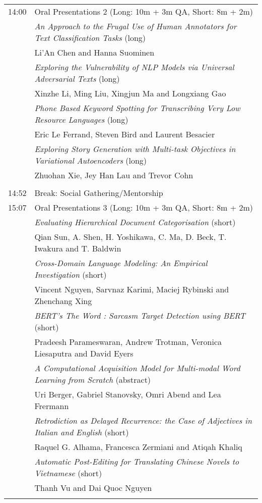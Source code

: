 \begin{longtable}{rl}
14:00 &   Oral Presentations 2 (Long: 10m + 3m QA, Short: 8m + 2m) \\
&  \emph{An Approach to the Frugal Use of Human Annotators for Text Classification Tasks} (long) \\
&  \hspace{.25cm} Li'An Chen and Hanna Suominen \\
&  \emph{Exploring the Vulnerability of NLP Models via Universal Adversarial Texts} (long)\\
&  \hspace{.25cm} Xinzhe Li, Ming Liu, Xingjun Ma and Longxiang Gao\\
&  \emph{Phone Based Keyword Spotting for Transcribing Very Low Resource Languages} (long)\\
&  \hspace{.25cm} Eric Le Ferrand, Steven Bird and Laurent Besacier \\
&  \emph{Exploring Story Generation with Multi-task Objectives in Variational Autoencoders} (long) \\
&  \hspace{.25cm} Zhuohan Xie, Jey Han Lau and Trevor Cohn \\ \\

14:52 & Break: Social Gathering/Mentorship\\

15:07 &   Oral Presentations 3 (Long: 10m + 3m QA, Short: 8m + 2m) \\
&  \emph{Evaluating Hierarchical Document Categorisation} (short) \\
&  \hspace{.25cm} Qian Sun, A. Shen, H. Yoshikawa, C. Ma, D. Beck, T. Iwakura and T. Baldwin \\
&  \emph{Cross-Domain Language Modeling: An Empirical Investigation} (short)\\
&  \hspace{.25cm} Vincent Nguyen, Sarvnaz Karimi, Maciej Rybinski and Zhenchang Xing\\
&  \emph{BERT's The Word : Sarcasm Target Detection using BERT} (short)\\
&  \hspace{.25cm} Pradeesh Parameswaran, Andrew Trotman, Veronica Liesaputra and David Eyers \\
&  \emph{A Computational Acquisition Model for Multi-modal Word Learning from Scratch} (abstract) \\
&  \hspace{.25cm} Uri Berger, Gabriel Stanovsky, Omri Abend and Lea Frermann \\
&  \emph{Retrodiction as Delayed Recurrence: the Case of Adjectives in Italian and English} (short) \\
&  \hspace{.25cm}Raquel G. Alhama, Francesca Zermiani and Atiqah Khaliq\\
&  \emph{Automatic Post-Editing for Translating Chinese Novels to Vietnamese} (short) \\
&  \hspace{.25cm}Thanh Vu and Dai Quoc Nguyen\\ \\


\end{longtable}
